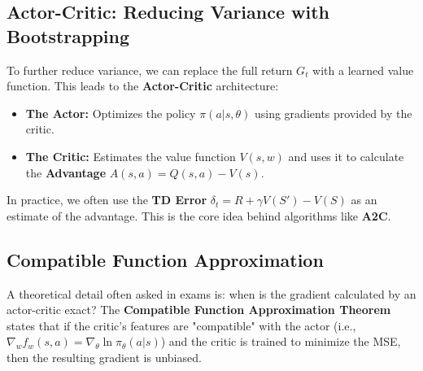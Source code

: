 \subsection{Actor-Critic: Reducing Variance with Bootstrapping}
To further reduce variance, we can replace the full return $G_t$ with a learned value function. This leads to the \textbf{Actor-Critic} architecture:
\begin{itemize}
    \item \textbf{The Actor:} Optimizes the policy $\pi(a|s, \theta)$ using gradients provided by the critic.
    \item \textbf{The Critic:} Estimates the value function $V(s, w)$ and uses it to calculate the \textbf{Advantage} $A(s, a) = Q(s, a) - V(s)$. 
\end{itemize}
In practice, we often use the \textbf{TD Error} $\delta_t = R + \gamma V(S') - V(S)$ as an estimate of the advantage. This is the core idea behind algorithms like \textbf{A2C}.

\subsection{Compatible Function Approximation}
A theoretical detail often asked in exams is: when is the gradient calculated by an actor-critic exact? The \textbf{Compatible Function Approximation Theorem} states that if the critic's features are "compatible" with the actor (i.e., $\nabla_w f_w(s, a) = \nabla_\theta \ln \pi_\theta(a|s)$) and the critic is trained to minimize the MSE, then the resulting gradient is unbiased.
